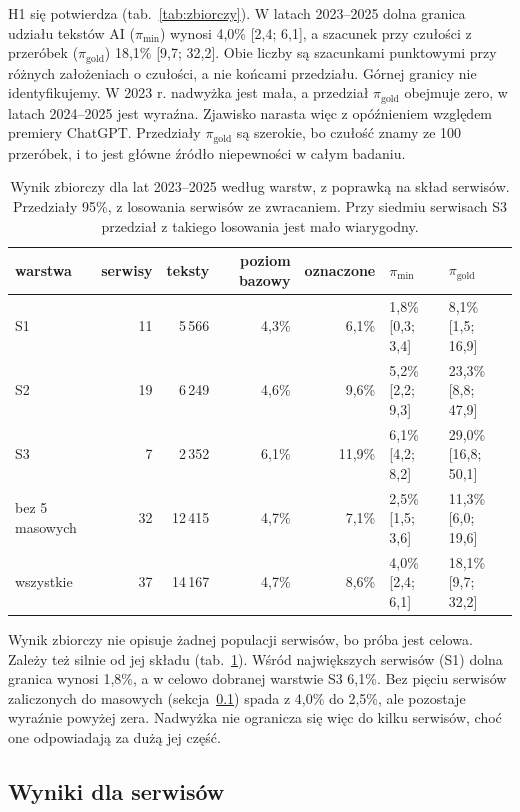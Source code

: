\documentclass[11pt,a4paper]{article}
\newcommand{\pimin}{\ensuremath{\pi_{\mathrm{min}}}}
\newcommand{\pigold}{\ensuremath{\pi_{\mathrm{gold}}}}
\begin{document}
H1 się potwierdza (tab.~\ref{tab:zbiorczy}). W latach 2023--2025 dolna granica udziału tekstów AI (\pimin) wynosi 4,0\% [2,4; 6,1], a szacunek przy czułości z przeróbek (\pigold) 18,1\% [9,7; 32,2]. Obie liczby są szacunkami punktowymi przy różnych założeniach o czułości, a nie końcami przedziału. Górnej granicy nie identyfikujemy. W 2023 r. nadwyżka jest mała, a przedział \pigold{} obejmuje zero, w latach 2024--2025 jest wyraźna. Zjawisko narasta więc z opóźnieniem względem premiery ChatGPT. Przedziały \pigold{} są szerokie, bo czułość znamy ze 100 przeróbek, i to jest główne źródło niepewności w całym badaniu.

\begin{table}[t]
\centering\footnotesize\setlength{\tabcolsep}{4pt}
\caption{Wynik zbiorczy dla lat 2023--2025 według warstw, z poprawką na skład serwisów. Przedziały 95\%, z losowania serwisów ze zwracaniem. Przy siedmiu serwisach S3 przedział z takiego losowania jest mało wiarygodny.}\label{tab:warstwy}
\begin{tabular}{@{}lrrrrll@{}}
\toprule
warstwa & serwisy & teksty & poziom bazowy & oznaczone & \pimin{} & \pigold{} \\
\midrule
S1 & 11 & 5\,566 & 4,3\% & 6,1\% & 1,8\% [0,3; 3,4] & 8,1\% [1,5; 16,9] \\
S2 & 19 & 6\,249 & 4,6\% & 9,6\% & 5,2\% [2,2; 9,3] & 23,3\% [8,8; 47,9] \\
S3 & 7 & 2\,352 & 6,1\% & 11,9\% & 6,1\% [4,2; 8,2] & 29,0\% [16,8; 50,1] \\
\midrule
bez 5 masowych & 32 & 12\,415 & 4,7\% & 7,1\% & 2,5\% [1,5; 3,6] & 11,3\% [6,0; 19,6] \\
wszystkie & 37 & 14\,167 & 4,7\% & 8,6\% & 4,0\% [2,4; 6,1] & 18,1\% [9,7; 32,2] \\
\bottomrule
\end{tabular}
\end{table}

Wynik zbiorczy nie opisuje żadnej populacji serwisów, bo próba jest celowa. Zależy też silnie od jej składu (tab.~\ref{tab:warstwy}). Wśród największych serwisów (S1) dolna granica wynosi 1,8\%, a w celowo dobranej warstwie S3 6,1\%. Bez pięciu serwisów zaliczonych do masowych (sekcja~\ref{sec:serwisy}) spada z 4,0\% do 2,5\%, ale pozostaje wyraźnie powyżej zera. Nadwyżka nie ogranicza się więc do kilku serwisów, choć one odpowiadają za dużą jej część.

\subsection{Wyniki dla serwisów}\label{sec:serwisy}
\end{document}
